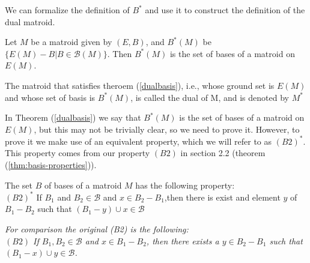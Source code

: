 

We can formalize the definition of $B^*$ and use it to construct the definition of the dual matroid.

\begin{theorem}\label{dualbasis}
    Let $M$ be a matroid given by $(E,B)$, and $B^*(M)$ be $\{E(M) - B|B\in \mathcal{B}(M)\}$. Then $B^*(M)$ is the set of bases of a matroid on $E(M)$.
\end{theorem}

\begin{defn}
     The matroid that satisfies theroem (\ref{dualbasis}), i.e., whose ground set is $E(M)$ and whose set of basis is $B^*(M)$, is called the dual of M, and is denoted by $M^*$
\end{defn}

In Theorem (\ref{dualbasis}) we say that $B^*(M)$ is the set of bases of a matroid on $E(M)$, but this may not be trivially clear, so we need to prove it. However, to prove it we make use of an equivalent property, which we will refer to as $(B2)^*$. This property comes from our property $(B2)$ in section 2.2 (theorem (\ref{thm:basis-properties})).

\begin{lemma}\label{B2Dual}
    The set $B$ of bases of a matroid $M$ has the following property:\\
    $(B2)^*$ If $B_1$ and $B_2 \in \mathcal{B}$ and $x \in B_2 - B_1$,then there is exist and element $y$ of $B_1 - B_2$ such that $(B_1 - y) \cup x \in \mathcal{B}$
\end{lemma}

\textit{For comparison the original (B2) is the following: \\
$(B2)$ If $B_1,B_2\in \mathcal{B}$ and $x\in B_1 - B_2$, then there exists a $y\in B_2 - B_1$ such that $(B_1 - x)\cup y \in \mathcal{B}$.}\\

